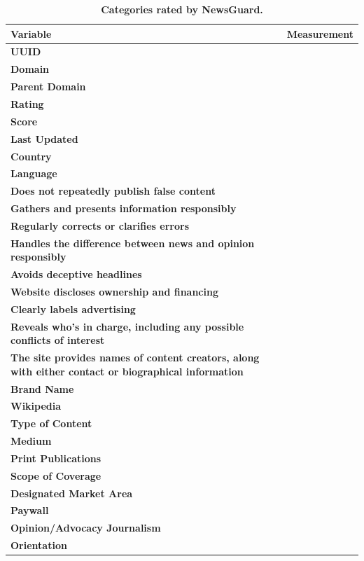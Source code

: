 \begin{table}[H]
\centering
\caption{\textbf{Categories rated by NewsGuard.}}
\label{tab:taba1}
\begin{tabularx}{\textwidth}{|X|c|}
\toprule
\textbf{Variable} & \textbf{Measurement} \\
\midrule
\textbf{UUID} &  \\
\hline
\textbf{Domain} & \\
\hline
\textbf{Parent Domain} & \\
\hline
\textbf{Rating} & \\
\hline
\textbf{Score} & \\
\hline
\textbf{Last Updated} & \\
\hline
\textbf{Country} & \\
\hline
\textbf{Language} & \\
\hline
\textbf{Does not repeatedly publish false content} & \\
\hline
\textbf{Gathers and presents information responsibly} & \\
\hline
\textbf{Regularly corrects or clarifies errors} & \\
\hline
\textbf{Handles the difference between news and opinion responsibly} & \\
\hline
\textbf{Avoids deceptive headlines} & \\
\hline
\textbf{Website discloses ownership and financing} & \\
\hline
\textbf{Clearly labels advertising} & \\
\hline
\textbf{Reveals who's in charge, including any possible conflicts of interest} & \\
\hline
\textbf{The site provides names of content creators, along with either contact or biographical information} & \\
\hline
\textbf{Brand Name} & \\
\hline
\textbf{Wikipedia} & \\
\hline
\textbf{Type of Content} & \\
\hline
\textbf{Medium} & \\
\hline
\textbf{Print Publications} & \\
\hline
\textbf{Scope of Coverage} & \\
\hline
\textbf{Designated Market Area} & \\
\hline
\textbf{Paywall} & \\
\hline
\textbf{Opinion/Advocacy Journalism} & \\
\hline
\textbf{Orientation} & \\

\end{tabularx}
\end{table}
